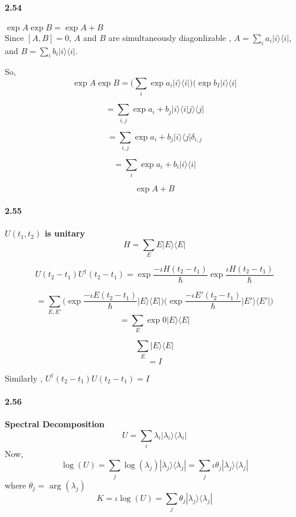 \paragraph{2.54} \textbf{$\exp{A} \exp{B} = \exp{A + B}$}%
\\
Since $[A,B] = 0$, $A$ and $B$ are simultaneously diagonlizable , $A = \sum_i a_i |i\rangle \langle i |$, and $B = \sum_i b_i |i\rangle \langle i |$.

So, 
$$ \exp{A} \exp{B} = \bigg( \sum_i \exp{a_i}|i\rangle \langle i |\bigg) \bigg( \exp{b_I} |i\rangle \langle i | $$

$$ = \sum_{i,j} \exp{a_i + b_j}|i\rangle \langle i | j\rangle \langle j | $$

$$ = \sum_{i,j} \exp{a_i + b_j}|i\rangle \langle j | \delta_{i,j}$$

$$ = \sum_{i} \exp{a_i + b_i}|i\rangle \langle i |$$

$$ \exp{A+B}$$

\paragraph{2.55} \textbf{$U(t_1, t_2)$ is unitary}%
\\
$$ H = \sum_{E} E |E\rangle \langle E|$$

$$ U(t_2 - t_1) U^{\dagger} (t_2 - t_1) = \exp{\frac{-\iota H (t_2 - t_1)}{\hbar}} \exp{\frac{\iota H (t_2 - t_1)}{\hbar}} $$

$$ = \sum_{E,E'}\bigg(\exp{\frac{-\iota E (t_2 - t_1)}{\hbar}} |E\rangle \langle E|\bigg) \bigg(\exp{\frac{-\iota E' (t_2 - t_1)}{\hbar}} |E'\rangle \langle E'|\bigg) $$
$$ = \sum_E \exp{0} |E\rangle \langle E|$$

$$ \sum_E |E\rangle \langle E|$$
$$ = I$$

Similarly , $U^{\dagger}(t_2 - t_1)U(t_2 - t_1) = I$

\paragraph{2.56} \textbf{Spectral Decomposition}%
\\
$$ U = \sum_i \lambda_i |\lambda_i \rangle \langle \lambda_i|$$
Now,
$$ \log(U) = \sum_{j} \log(\lambda_j) |\lambda_j \rangle \langle \lambda_j| = \sum_j \iota \theta_j |\lambda_j\rangle \langle \lambda_j|$$
where $\theta_j = \text{ arg }(\lambda_j)$
$$ K = \iota \log(U) = \sum_j \theta_j |\lambda_j\rangle \langle \lambda_j|$$

